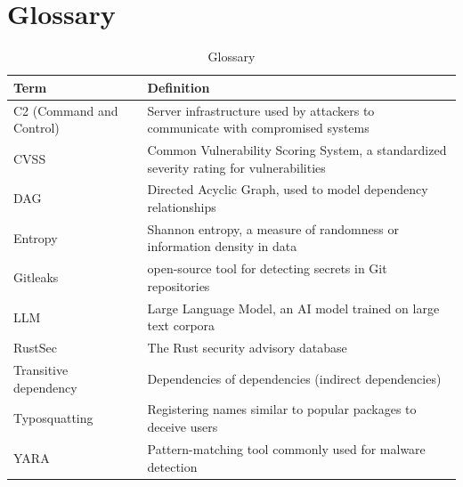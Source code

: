 \chapter{Glossary}\label{appendix:glossary}

\begin{table}[h]
\centering
\begin{tabular}{|l|p{10cm}|}
\hline
\textbf{Term} & \textbf{Definition} \\
\hline
C2 (Command and Control) & Server infrastructure used by attackers to communicate with compromised systems \\
\hline
CVSS & Common Vulnerability Scoring System, a standardized severity rating for vulnerabilities \\
\hline
DAG & Directed Acyclic Graph, used to model dependency relationships \\
\hline
Entropy & Shannon entropy, a measure of randomness or information density in data \\
\hline
Gitleaks & open-source tool for detecting secrets in Git repositories \\
\hline
LLM & Large Language Model, an AI model trained on large text corpora \\
\hline
RustSec & The Rust security advisory database \\
\hline
Transitive dependency & Dependencies of dependencies (indirect dependencies) \\
\hline
Typosquatting & Registering names similar to popular packages to deceive users \\
\hline
YARA & Pattern-matching tool commonly used for malware detection \\
\hline
\end{tabular}
\caption{Glossary}
\label{tab:glossary}
\end{table}